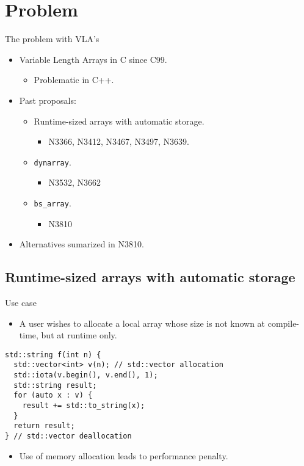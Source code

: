 \section{Problem}

\begin{frame}{The problem with VLA's}
  \begin{itemize}
    \item Variable Length Arrays in C since C99.
      \begin{itemize}
        \item Problematic in C++.
      \end{itemize}
    \item Past proposals:
      \begin{itemize}
        \item Runtime-sized arrays with automatic storage.
          \begin{itemize}
            \item N3366, N3412, N3467, N3497, N3639.
          \end{itemize}
        \item \texttt{dynarray}.
          \begin{itemize}
            \item N3532, N3662
          \end{itemize}
        \item \texttt{bs\_array}.
          \begin{itemize}
            \item N3810
          \end{itemize}
      \end{itemize}
    \item Alternatives sumarized in N3810.
  \end{itemize}
\end{frame}

\subsection{Runtime-sized arrays with automatic storage}

\begin{frame}[fragile]{Use case}
  \begin{itemize}
    \item A user wishes to allocate a local array whose size is not known at compile-time, but at runtime only.
  \end{itemize}
\pause
\begin{lstlisting}[style=cpp11]
std::string f(int n) {
  std::vector<int> v(n); // std::vector allocation
  std::iota(v.begin(), v.end(), 1);
  std::string result;
  for (auto x : v) {
    result += std::to_string(x);
  }
  return result;
} // std::vector deallocation
\end{lstlisting}
  \begin{itemize}
    \item \alert{Use of memory allocation leads to performance penalty}.
  \end{itemize}
\end{frame}

